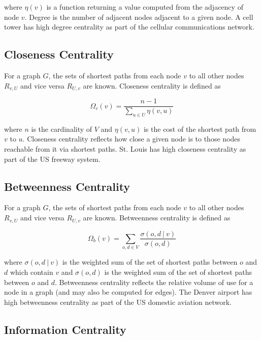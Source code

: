 where $\eta(v)$ is a function returning a value computed from the adjacency of node $v$. Degree is the number of adjacent nodes adjacent to a given node. A cell tower has high degree centrality as part of the cellular communications network.

\subsection{Closeness Centrality}

For a graph $G$, the sets of shortest paths from each node $v$ to all other nodes $R_{v,U}$ and vice versa $R_{U,v}$ are known. Closeness centrality is defined as

\begin{equation}
	\Omega_c(v) = \frac{n - 1}{\sum_{u \in U} \eta(v, u)}
\end{equation}

where $n$ is the cardinality of $V$ and $\eta(v, u)$ is the cost of the shortest path from $v$ to $u$. Closeness centrality reflects how close a given node is to those nodes reachable from it via shortest paths. St. Louis has high closeness centrality as part of the US freeway system.

\subsection{Betweenness Centrality}

For a graph $G$, the sets of shortest paths from each node $v$ to all other nodes $R_{v,U}$ and vice versa $R_{U,v}$ are known. Betweenness centrality is defined as

\begin{equation}
	\Omega_b(v) = \sum_{o, d \in V}\frac{\sigma(o, d\ |\ v)}{\sigma(o, d)}\label{eq:betweenness_centrality}
\end{equation}

where $\sigma(o, d\ |\ v)$ is the weighted sum of the set of shortest paths between $o$ and $d$ which contain $v$ and $\sigma(o, d)$ is the weighted sum of the set of shortest paths between $o$ and $d$. Betweenness centrality reflects the relative volume of use for a node in a graph (and may also be computed for edges). The Denver airport has high betweenness centrality as part of the US domestic aviation network.

\subsection{Information Centrality}

